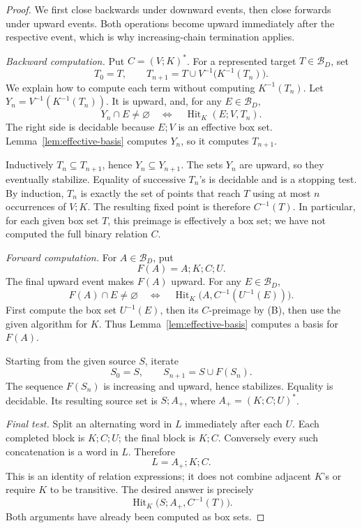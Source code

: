 \documentclass[11pt,a4paper]{article}
\theoremstyle{definition}
\theoremstyle{remark}
\begin{document}
\begin{proof}
We first close backwards under downward events, then close forwards
under upward events. Both operations become upward immediately after
the respective event, which is why increasing-chain termination
applies.

\emph{Backward computation.}
Put \(C=(V;K)^*\). For a represented target \(T\in\mathcal B_D\), set
\[
 T_0=T,\qquad
 T_{n+1}=T\cup V^{-1}\bigl(K^{-1}(T_n)\bigr).
 \tag{B}
\]
We explain how to compute each term without computing \(K^{-1}(T_n)\).
Let \(Y_n=V^{-1}(K^{-1}(T_n))\). It is upward, and, for any
\(E\in\mathcal B_D\),
\[
 Y_n\cap E\neq\varnothing
 \quad\Longleftrightarrow\quad
 \operatorname{Hit}_K(E;V,T_n).
\]
The right side is decidable because \(E;V\) is an effective box set.
Lemma~\ref{lem:effective-basis} computes \(Y_n\), so it computes
\(T_{n+1}\).

Inductively \(T_n\subseteq T_{n+1}\), hence \(Y_n\subseteq Y_{n+1}\).
The sets \(Y_n\) are upward, so they eventually stabilize. Equality of
successive \(T_n\)'s is decidable and is a stopping test. By induction,
\(T_n\) is exactly the set of points that reach \(T\) using at most
\(n\) occurrences of \(V;K\). The resulting fixed point is therefore
\(C^{-1}(T)\). In particular, for each given box set \(T\), this
preimage is effectively a box set; we have not computed the full
binary relation \(C\).

\emph{Forward computation.}
For \(A\in\mathcal B_D\), put
\[
 F(A)=A;K;C;U.
\]
The final upward event makes \(F(A)\) upward. For any
\(E\in\mathcal B_D\),
\[
 F(A)\cap E\neq\varnothing
 \quad\Longleftrightarrow\quad
 \operatorname{Hit}_K
 \bigl(A,C^{-1}(U^{-1}(E))\bigr).
\]
First compute the box set \(U^{-1}(E)\), then its \(C\)-preimage by
(B), then use the given algorithm for \(K\). Thus
Lemma~\ref{lem:effective-basis} computes a basis for \(F(A)\).

Starting from the given source \(S\), iterate
\[
 S_0=S,\qquad S_{n+1}=S\cup F(S_n).
 \tag{F}
\]
The sequence \(F(S_n)\) is increasing and upward, hence stabilizes.
Equality is decidable. Its resulting source set is
\(S;A_+\), where \(A_+=(K;C;U)^*\).

\emph{Final test.}
Split an alternating word in \(L\) immediately after each \(U\).
Each completed block is \(K;C;U\); the final block is \(K;C\).
Conversely every such concatenation is a word in \(L\). Therefore
\[
 L=A_+;K;C.
\]
This is an identity of relation expressions; it does not combine
adjacent \(K\)'s or require \(K\) to be transitive.
The desired answer is precisely
\[
 \operatorname{Hit}_K\bigl(S;A_+,C^{-1}(T)\bigr).
\]
Both arguments have already been computed as box sets.
\end{proof}
\end{document}
